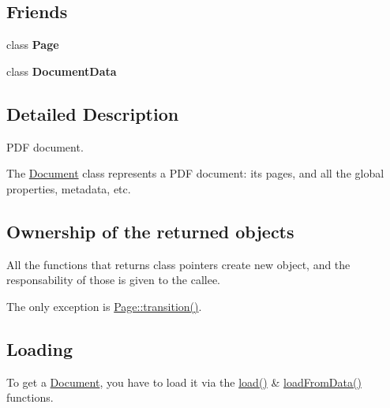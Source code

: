 \subsection*{Friends}
\begin{DoxyCompactItemize}
\item 
\mbox{\label{class_poppler_1_1_document_a66d145c56e1747e0aecb5309042ab183}} 
class {\bfseries Page}
\item 
\mbox{\label{class_poppler_1_1_document_a5f30d346de2175fe7a14e3faac37e209}} 
class {\bfseries Document\+Data}
\end{DoxyCompactItemize}


\subsection{Detailed Description}
P\+DF document. 

The \hyperlink{class_poppler_1_1_document}{Document} class represents a P\+DF document\+: its pages, and all the global properties, metadata, etc.\hypertarget{class_poppler_1_1_document_ownership}{}\subsection{Ownership of the returned objects}\label{class_poppler_1_1_document_ownership}
All the functions that returns class pointers create new object, and the responsability of those is given to the callee.

The only exception is \hyperlink{class_poppler_1_1_page_aff7331566a9cbf659f625f73ee05f746}{Page\+::transition()}.\hypertarget{class_poppler_1_1_document_document-loading}{}\subsection{Loading}\label{class_poppler_1_1_document_document-loading}
To get a \hyperlink{class_poppler_1_1_document}{Document}, you have to load it via the \hyperlink{class_poppler_1_1_document_a89330667f1fbc13cdc481cc61f417c82}{load()} \& \hyperlink{class_poppler_1_1_document_a47379f6241b011a58c1d8f10cea10dfc}{load\+From\+Data()} functions.

